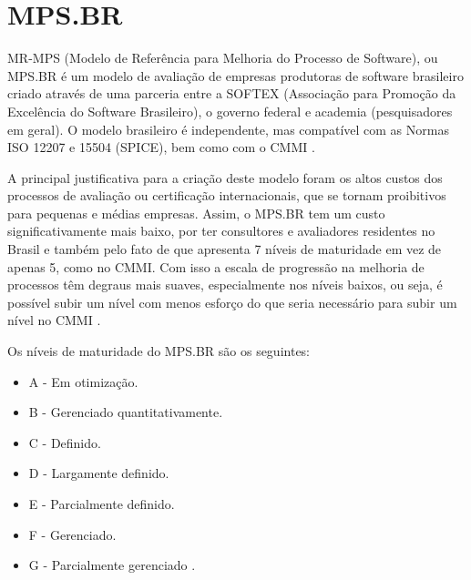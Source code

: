 \documentclass[12pt]{article}
\begin{document}
\section{MPS.BR}

MR-MPS (Modelo de Referência para Melhoria do Processo de Software), ou MPS.BR é um modelo de avaliação de empresas produtoras de software brasileiro criado através de uma parceria entre a SOFTEX (Associação para Promoção da Excelência do Software Brasileiro), o governo federal e academia (pesquisadores em geral). O modelo brasileiro é independente, mas compatível com as Normas ISO 12207 e 15504 (SPICE), bem como com o CMMI \cite{sommerville2007engenharia}.

A principal justificativa para a criação deste modelo foram os altos custos dos processos de avaliação ou certificação internacionais, que se tornam proibitivos para pequenas e médias empresas. Assim, o MPS.BR tem um custo significativamente mais baixo, por ter consultores e avaliadores residentes no Brasil e também pelo fato de que apresenta 7 níveis de maturidade em vez de apenas 5, como no CMMI. Com isso a escala de progressão na melhoria de processos têm degraus mais suaves, especialmente nos níveis baixos, ou seja, é possível subir um nível com menos esforço do que seria necessário para subir um nível no CMMI \cite{sommerville2007engenharia}.

Os níveis de maturidade do MPS.BR são os seguintes:
\begin{itemize}
    \item A - Em otimização.
    \item B - Gerenciado quantitativamente.
    \item C - Definido.
    \item D - Largamente definido.
    \item E - Parcialmente definido.
    \item F - Gerenciado.
    \item G - Parcialmente gerenciado \cite{sommerville2007engenharia}.
\end{itemize}
\end{document}
